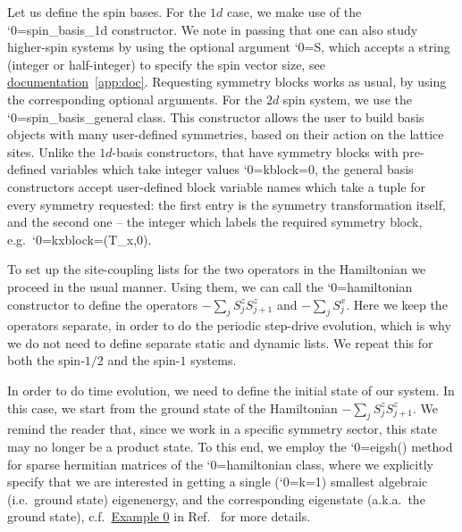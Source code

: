 \documentclass{SciPost}
\newcommand\0{\scalebox{-1}[1]{0}}
\let\svttfamily\ttfamily
\renewcommand\ttfamily{\svttfamily\catcode`0=\active }
\renewcommand\texttt{\bgroup\ttfamily\texttthelp}
\def\texttthelp#1{#1\egroup}
\newcommand{\Spincode}{example9.py}
\begin{document}

Let us define the spin bases. For the $1d$ case, we make use of the \texttt{spin\_basis\_1d} constructor. We note in passing that one can also study higher-spin systems by using the optional argument \texttt{S}, which accepts a string (integer or half-integer) to specify the spin vector size, see \href{http://weinbe58.github.io/QuSpin/index.html}{documentation}~\ref{app:doc}. Requesting symmetry blocks works as usual, by using the corresponding optional arguments. For the $2d$ spin system, we use the \texttt{spin\_basis\_general} class. This constructor allows the user to build basis objects with many user-defined symmetries, based on their action on the lattice sites. Unlike the $1d$-basis constructors, that have symmetry blocks with pre-defined variables which take integer values \texttt{kblock=0}, the general basis constructors accept user-defined block variable names which take a tuple for every symmetry requested: the first entry is the symmetry transformation itself, and the second one -- the integer which labels the required symmetry block, e.g.~\texttt{kxblock=(T\_x,0)}.
 
To set up the site-coupling lists for the two operators in the Hamiltonian we proceed in the usual manner. Using them, we can call the \texttt{hamiltonian} constructor to define the operators $-\sum_j S^z_{j}S^z_{j+1}$ and $-\sum_j S^x_j$. Here we keep the operators separate, in order to do the periodic step-drive evolution, which is why we do not need to define separate static and dynamic lists. We repeat this for both the spin-$1/2$ and the spin-$1$ systems.

In order to do time evolution, we need to define the initial state of our system. In this case, we start from the ground state of the Hamiltonian $-\sum_j S^z_{j}S^z_{j+1}$. We remind the reader that, since we work in a specific symmetry sector, this state may no longer be a product state. To this end, we employ the \texttt{eigsh()} method for sparse hermitian matrices of the \texttt{hamiltonian} class, where we explicitly specify that we are interested in getting a single (\texttt{k=1}) smallest algebraic (i.e.~ground state) eigenenergy, and the corresponding eigenstate (a.k.a.~the ground state), c.f.~\href{http://weinbe58.github.io/QuSpin/examples/example0.html}{Example 0} in Ref.~\cite{weinberg_17_quspin} for more details. 

\end{document}

